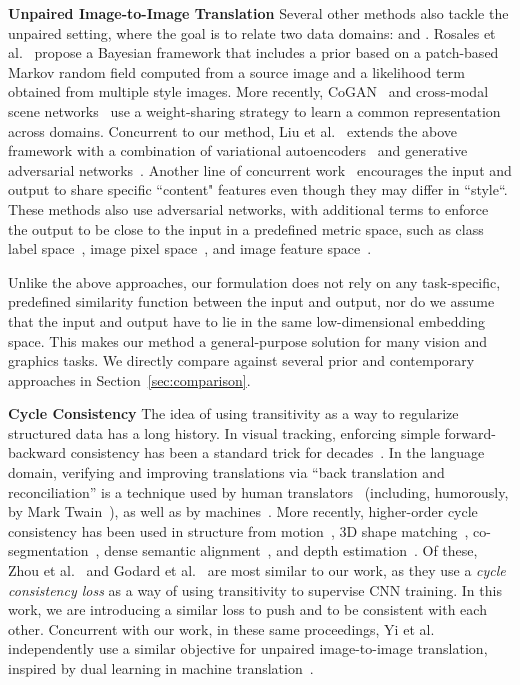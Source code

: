 \documentclass[10pt,twocolumn,letterpaper]{article}
\newcommand{\refsec}[1]{Section~\ref{sec:#1}}
\newcommand{\shortcite}[1]{\cite{#1}}
\begin{document}
{\bf Unpaired Image-to-Image Translation}
Several other methods also tackle the unpaired setting, where the goal is to relate two data domains:  and . Rosales et al.~\shortcite{rosales2003unsupervised} propose a Bayesian framework that includes a prior based on a patch-based Markov random field computed from a source image and a likelihood term obtained from multiple style images. More recently, CoGAN~\cite{liu2016coupled} and cross-modal scene networks~\cite{aytar2016cross} use a weight-sharing strategy to learn a common representation across domains. 
Concurrent to our method, Liu et al.~\shortcite{liu2017unsupervised} extends the above framework with a combination of variational autoencoders~\cite{kingma2013auto} and generative adversarial networks~\cite{goodfellow2014generative}.
Another line of concurrent work~\cite{shrivastava2016learning,taigman2016unsupervised,bousmalis2016unsupervised} encourages the input and output to share specific ``content" features even though they may differ in ``style``. These methods also use adversarial networks, with additional terms to enforce the output to be close to the input in a predefined metric space, such as class label space~\cite{bousmalis2016unsupervised}, image pixel space~\cite{shrivastava2016learning}, and image feature space~\cite{taigman2016unsupervised}. 

Unlike the above approaches, our formulation does not rely on any task-specific, predefined similarity function between the input and output, nor do we assume that the input and output have to lie in the same low-dimensional embedding space. This makes our method a general-purpose solution for many vision and graphics tasks. We directly compare against several prior and contemporary approaches in \refsec{comparison}.

{\bf Cycle Consistency}
The idea of using transitivity as a way to regularize structured data has a long history.  In visual tracking, enforcing simple forward-backward consistency has been a standard trick for decades~\cite{kalal2010forward,sundaram2010dense}. In the language domain, verifying and improving translations via ``back translation and reconciliation'' is a technique used by human translators~\cite{brislin1970back} (including, humorously, by Mark Twain~\cite{twain1903}), as well as by machines~\cite{he2016dual}. 
More recently, higher-order cycle consistency has been used in
structure from motion~\cite{zach2010disambiguating},
3D shape matching~\cite{huang2013consistent}, co-segmentation~\cite{wang2013image}, dense semantic alignment~\cite{zhou2015flowweb,zhou2016learning}, and depth estimation~\cite{godard2016unsupervised}.  Of these, Zhou et al.~\cite{zhou2016learning} and Godard et al.~\cite{godard2016unsupervised} are most similar to our work, as they use a {\em cycle consistency loss} as a way of using transitivity to supervise CNN training.
In this work, we are introducing a similar loss to push  and  to be consistent with each other.  Concurrent with our work, in these same proceedings, Yi et al.~\cite{yi2017dualgan} independently use a similar objective for unpaired image-to-image translation, inspired by dual learning in machine translation~\cite{he2016dual}.
\end{document}
